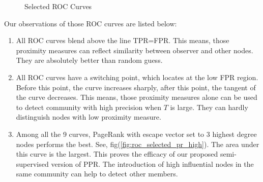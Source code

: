 \documentclass[11pt,a4paper]{article}
\begin{document}
\begin{figure}[htb]
\centering
{}
\caption{Selected ROC Curves}
\label{fig:roc_selected}
\end{figure}

Our observations of those ROC curves are listed below:
\begin{enumerate}
	\item All ROC curves blend above the line TPR=FPR. This means, 
	those proximity measures can reflect similarity between observer
	and other nodes. They are absolutely better than random guess. 
	\item All ROC curves have a switching point, which locates 
	at the low FPR region. Before this point, the curve increases 
	sharply, after this point, the tangent of the curve decreases.
	This means, those proximity measures alone can be used to detect 
	community with high precision when $T$ is large. They can 
	hardly distinguish nodes with low proximity measure. 
	\item Among all the 9 curves, PageRank with escape vector set to 
	3 highest degree nodes performs the best. See, fig(\ref{fig:roc_selected_pr_high}). 
	The area under this curve is the largest. This proves 
	the efficacy of our proposed semi-supervised version of PPR. 
	The introduction of high influential nodes in the same community
	can help to detect other members. 
\end{enumerate}
\end{document}
